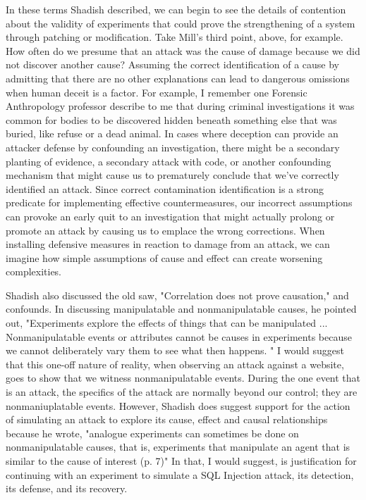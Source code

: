 In these terms Shadish described, we can begin to see the details of contention about the validity of experiments that could prove the strengthening of a system through patching or modification. Take Mill's third point, above, for example. How often do we presume that an \gls{attack} was the cause of damage because we did not discover another cause? Assuming the correct identification of a cause by admitting that there are no other explanations can lead to dangerous omissions when human deceit is a factor. For example, I remember one Forensic Anthropology professor describe to me that during criminal investigations it was common for bodies to be discovered hidden beneath something else that was buried, like refuse or a dead animal. In cases where deception can provide an attacker defense by confounding an investigation, there might be a secondary planting of evidence, a secondary \gls{attack} with code, or another confounding mechanism that might cause us to prematurely conclude that we've correctly identified an \gls{attack}. Since correct contamination identification is a strong predicate for implementing effective countermeasures, our incorrect assumptions can provoke an early quit to an investigation that might actually prolong or promote an \gls{attack} by causing us to emplace the wrong corrections. When installing defensive measures in reaction to damage from an \gls{attack}, we can imagine how simple assumptions of cause and effect can create worsening complexities.

Shadish also discussed the old saw, "Correlation does not prove causation," and confounds. In discussing manipulatable and nonmanipulatable causes, he pointed out, "Experiments explore the effects of things that can be manipulated ... Nonmanipulatable events or attributes cannot be causes in experiments because we cannot deliberately vary them to see what then happens. " I would suggest that this one-off nature of reality, when observing an \gls{attack} against a website, goes to show that we witness nonmanipulatable events. During the one event that is an \gls{attack}, the specifics of the \gls{attack} are normally beyond our control; they are nonmaniuplatable events. However, Shadish does suggest support for the action of simulating an \gls{attack} to explore its cause, effect and causal relationships because he wrote, "analogue experiments can sometimes be done on nonmanipulatable causes, that is, experiments that manipulate an agent that is similar to the cause of interest (p. 7)" In that, I would suggest, is justification for continuing with an experiment to simulate a SQL Injection \gls{attack}, its detection, its defense, and its recovery.

